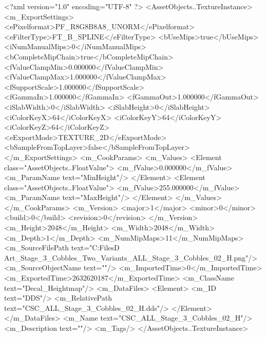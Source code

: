 <?xml version="1.0" encoding="UTF-8" ?>
<AssetObjects..TextureInstance>
	<m_ExportSettings>
		<ePixelformat>PF_R8G8B8A8_UNORM</ePixelformat>
		<eFilterType>FT_B_SPLINE</eFilterType>
		<bUseMips>true</bUseMips>
		<iNumManualMips>0</iNumManualMips>
		<bCompleteMipChain>true</bCompleteMipChain>
		<fValueClampMin>0.000000</fValueClampMin>
		<fValueClampMax>1.000000</fValueClampMax>
		<fSupportScale>1.000000</fSupportScale>
		<fGammaIn>1.000000</fGammaIn>
		<fGammaOut>1.000000</fGammaOut>
		<iSlabWidth>0</iSlabWidth>
		<iSlabHeight>0</iSlabHeight>
		<iColorKeyX>64</iColorKeyX>
		<iColorKeyY>64</iColorKeyY>
		<iColorKeyZ>64</iColorKeyZ>
		<eExportMode>TEXTURE_2D</eExportMode>
		<bSampleFromTopLayer>false</bSampleFromTopLayer>
	</m_ExportSettings>
	<m_CookParams>
		<m_Values>
			<Element class="AssetObjects..FloatValue">
				<m_fValue>0.000000</m_fValue>
				<m_ParamName text="MinHeight"/>
			</Element>
			<Element class="AssetObjects..FloatValue">
				<m_fValue>255.000000</m_fValue>
				<m_ParamName text="MaxHeight"/>
			</Element>
		</m_Values>
	</m_CookParams>
	<m_Version>
		<major>1</major>
		<minor>0</minor>
		<build>0</build>
		<revision>0</revision>
	</m_Version>
	<m_Height>2048</m_Height>
	<m_Width>2048</m_Width>
	<m_Depth>1</m_Depth>
	<m_NumMipMaps>11</m_NumMipMaps>
	<m_SourceFilePath text="C:\Users\Shadow\Desktop\Working Files\3D Art\Decals\CSC_Stage_3_Cobbles_Two_Variants\rectangular\textures\CSC_ALL_Stage_3_Cobbles_02_H.png"/>
	<m_SourceObjectName text=""/>
	<m_ImportedTime>0</m_ImportedTime>
	<m_ExportedTime>2632620187</m_ExportedTime>
	<m_ClassName text="Decal_Heightmap"/>
	<m_DataFiles>
		<Element>
			<m_ID text="DDS"/>
			<m_RelativePath text="CSC_ALL_Stage_3_Cobbles_02_H.dds"/>
		</Element>
	</m_DataFiles>
	<m_Name text="CSC_ALL_Stage_3_Cobbles_02_H"/>
	<m_Description text=""/>
	<m_Tags/>
</AssetObjects..TextureInstance>
